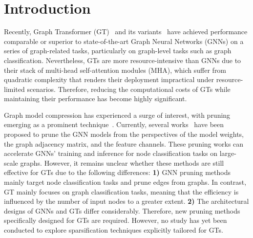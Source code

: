 \documentclass[letterpaper]{article} %
\begin{document}






\section{Introduction}
\label{sec:introduction}

Recently, Graph Transformer (GT)~\cite{graph-transformer} and its variants~\cite{graphtrans,graphormer-v1,graphgps} have achieved performance comparable or superior to state-of-the-art Graph Neural Networks (GNNs) on a series of graph-related tasks, particularly on graph-level tasks such as graph classification. Nevertheless, GTs are more resource-intensive than GNNs due to their stack of multi-head self-attention modules (MHA), which suffer from quadratic complexity that renders their deployment impractical under resource-limited scenarios. Therefore, 
reducing the computational costs of GTs while maintaining their performance has become highly significant.

Graph model compression has experienced a surge of interest, with pruning emerging as a prominent technique~\cite{surve-graph-pruning}. Currently, several works~\cite{ugs,gebt,glt,cgp} have been proposed to prune the GNN models from the perspectives of the model weights, the graph adjacency matrix, and the feature channels. These pruning works can accelerate GNNs' training and inference for node classification tasks on large-scale graphs. However, it remains unclear whether these methods are still effective for GTs due to the following differences: \textbf{1)} GNN pruning methods mainly target node classification tasks and prune edges from graphs. In contrast, GT mainly focuses on graph classification tasks, meaning that the efficiency is influenced by the number of input nodes to a greater extent. \textbf{2)} The architectural designs of GNNs and GTs differ considerably. Therefore, new pruning methods specifically designed for GTs are required. However, no study has yet been conducted to explore sparsification techniques explicitly tailored for GTs. 
\end{document}
